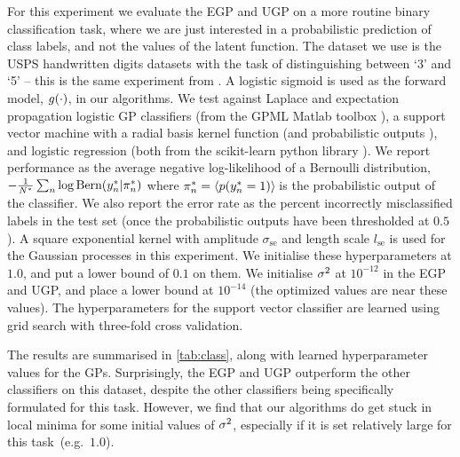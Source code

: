 \documentclass{article} %
\begin{document}
For this experiment we evaluate the EGP and UGP on a more routine binary
classification task, where we are just interested in a probabilistic prediction
of class labels, and not the values of the latent function. The dataset we use
is the USPS handwritten digits datasets with the task of distinguishing between
`3' and `5' -- this is the same experiment from \cite{Rasmussen2006}. A
logistic sigmoid is used as the forward model, $g\!\left({{\cdot}}\right)$, in our
algorithms. We test against Laplace and expectation propagation logistic GP
classifiers (from the GPML Matlab toolbox \cite{Rasmussen2006}), a support
vector machine with a radial basis kernel function (and probabilistic outputs
\cite{Platt1999}), and logistic regression (both from the scikit-learn python
library \cite{scikit-learn}).  We report performance as the average negative
log-likelihood of a Bernoulli distribution, $-\frac{1}{N^{*}} \sum_n \log
\textrm{Bern}\!\left({y_n^{*}}\middle\vert{\pi\ensuremath{^{*}}_n}\right)$ where $\pi^{*}_n =
\left\langle{\ensuremath{p\!\left({y^{*}_n = 1}\right)}}\right\rangle_{\!{}}$ is the probabilistic output of the
classifier. We also report the error rate as the percent incorrectly
misclassified labels in the test set (once the probabilistic outputs have been
thresholded at $0.5$). A square exponential kernel with amplitude
$\sigma_\text{se}$ and length scale $l_\text{se}$ is used for the Gaussian
processes in this experiment. We initialise these hyperparameters at $1.0$, and
put a lower bound of $0.1$ on them. We initialise $\sigma^2$ at $10^{-12}$ in the
EGP and UGP, and place a lower bound at $10^{-14}$ (the optimized values are
near these values). The hyperparameters for the support vector classifier are
learned using grid search with three-fold cross validation. 

The results are summarised in \autoref{tab:class}, along with learned
hyperparameter values for the GPs. Surprisingly, the EGP and UGP outperform the
other classifiers on this dataset, despite the other classifiers being
specifically formulated for this task. However, we find that our algorithms do
get stuck in local minima for some initial values of $\sigma^2$, especially if it
is set relatively large for this task~(e.g.~$1.0$).
\end{document}
